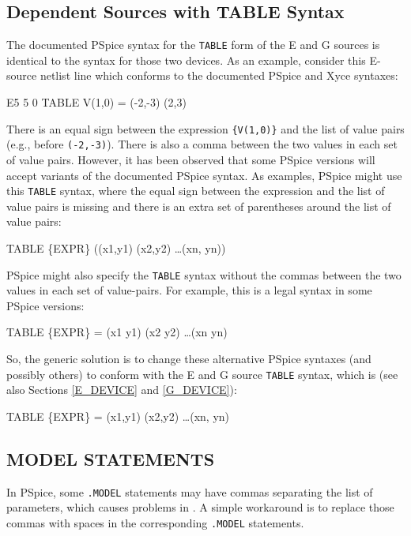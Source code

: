 \subsection{Dependent Sources with TABLE Syntax}
\label{DS_TABLE_SYNTAX_DIFF}
The documented PSpice syntax for the \texttt{TABLE} form of the E and G sources
is identical to the \Xyce{} syntax for those two devices.  As an example, consider 
this E-source netlist line which conforms to the documented PSpice and Xyce 
syntaxes:
\begin{vquote}
E5  5 0 TABLE {V(1,0)} = (-2,-3) (2,3)
\end{vquote}
There is an equal sign between the expression \texttt{\{V(1,0)\}} and the list of
value pairs (e.g., before \texttt{(-2,-3)}).  There is also a comma between the two values
in each set of value pairs.  However, it has been observed that some PSpice versions 
will accept variants of the documented PSpice syntax.  As examples, PSpice might 
use this \texttt{TABLE} syntax, where the equal sign between the expression and the 
list of value pairs is missing and there is an extra set of parentheses around 
the list of value pairs:
\begin{vquote}
TABLE \{EXPR\} ((x1,y1) (x2,y2) \ldots (xn, yn))
\end{vquote}
PSpice might also specify the \texttt{TABLE} syntax without the commas between the 
two values in each set of value-pairs. For example, this is a legal syntax in some 
PSpice versions:
\begin{vquote}
TABLE \{EXPR\} = (x1 y1) (x2 y2) \ldots (xn yn)
\end{vquote}
So, the generic solution is to change these alternative PSpice syntaxes (and possibly 
others) to conform with the \Xyce{} E and G source \texttt{TABLE} syntax, which is
(see also Sections \ref{E_DEVICE} and \ref{G_DEVICE}):
\begin{vquote}
TABLE \{EXPR\} = (x1,y1) (x2,y2) \ldots (xn, yn)
\end{vquote}

\subsection{MODEL STATEMENTS}
\label{MODEL_STATEMENT_SYNTAX_DIFF}
In PSpice, some \texttt{.MODEL} statements may have commas separating the list
of parameters, which causes problems in \Xyce{}.  A simple workaround is to
replace those commas with spaces in the corresponding \Xyce{} \texttt{.MODEL}
statements.

